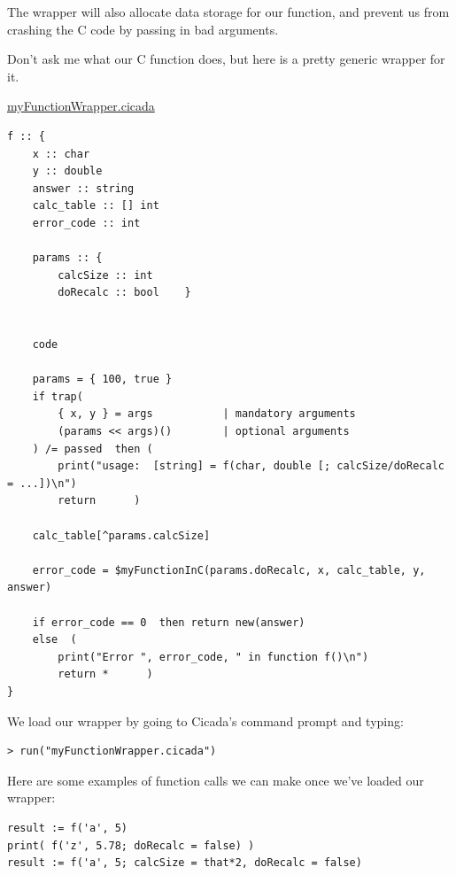 \documentclass{article}
\newenvironment{code}{
       \begin{list}{}{
               \setlength{\leftmargin}{.4in}
               \setlength{\rightmargin}{0in}
               \setlength{\topsep}{.2in}
       }
       \small
       \item[] }
       { \end{list}   }
\begin{document}
\noindent The wrapper will also allocate data storage for our function, and prevent us from crashing the C code by passing in bad arguments.

Don't ask me what our C function does, but here is a pretty generic wrapper for it.\\\vspace{.2in}

\noindent \underline{myFunctionWrapper.cicada}

\begin{code} \begin{verbatim}
f :: {
    x :: char
    y :: double
    answer :: string
    calc_table :: [] int
    error_code :: int
    
    params :: {
        calcSize :: int
        doRecalc :: bool    }
    
    
    code
    
    params = { 100, true }
    if trap(
        { x, y } = args           | mandatory arguments
        (params << args)()        | optional arguments
    ) /= passed  then (
        print("usage:  [string] = f(char, double [; calcSize/doRecalc = ...])\n")
        return      )
    
    calc_table[^params.calcSize]
    
    error_code = $myFunctionInC(params.doRecalc, x, calc_table, y, answer)
    
    if error_code == 0  then return new(answer)
    else  (
        print("Error ", error_code, " in function f()\n")
        return *      )
}
\end{verbatim} \end{code}

\noindent We load our wrapper by going to Cicada's command prompt and typing:

\begin{code} \begin{verbatim}
> run("myFunctionWrapper.cicada")
\end{verbatim} \end{code}

\noindent Here are some examples of function calls we can make once we've loaded our wrapper:

\begin{code} \begin{verbatim}
result := f('a', 5)
print( f('z', 5.78; doRecalc = false) )
result := f('a', 5; calcSize = that*2, doRecalc = false)
\end{verbatim} \end{code}
\end{document}
